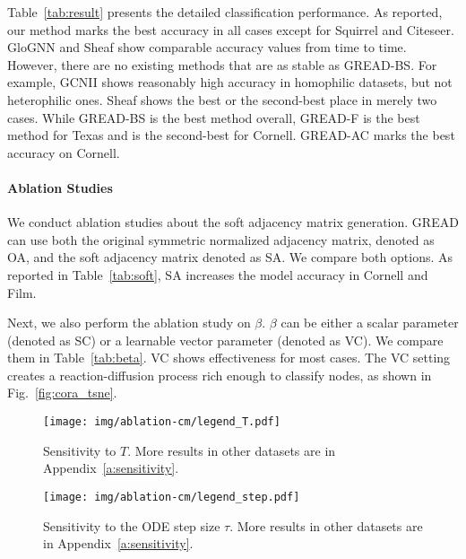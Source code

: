 \documentclass{article}
\theoremstyle{plain}
\theoremstyle{definition}
\theoremstyle{remark}
\begin{document}
Table~\ref{tab:result} presents the detailed classification performance. As reported, our method marks the best accuracy in all cases except for Squirrel and Citeseer. GloGNN and Sheaf show comparable accuracy values from time to time. However, there are no existing methods that are as stable as GREAD-BS. For example, GCNII shows reasonably high accuracy in homophilic datasets, but not heterophilic ones. Sheaf shows the best or the second-best place in merely two cases. While GREAD-BS is the best method overall, GREAD-F is the best method for Texas and is the second-best for Cornell. GREAD-AC marks the best accuracy on Cornell.

 
\paragraph{Ablation Studies} We conduct ablation studies about the soft adjacency matrix generation. GREAD can use both the original symmetric normalized adjacency matrix, denoted as OA, and the soft adjacency matrix denoted as SA. We compare both options. As reported in Table~\ref{tab:soft}, SA increases the model accuracy in Cornell and Film.

Next, we also perform the ablation study on $\beta$. $\beta$ can be either a scalar parameter (denoted as SC) or a learnable vector parameter (denoted as VC). We compare them in Table~\ref{tab:beta}. VC shows effectiveness for most cases. The VC setting creates a reaction-diffusion process rich enough to classify nodes, as shown in Fig.~\ref{fig:cora_tsne}.

 \begin{figure}[t]
    \centering
    \texttt{[image: img/ablation-cm/legend\_T.pdf]}
    \caption{Sensitivity to $T$. More results in other datasets are in Appendix~\ref{a:sensitivity}.}
    \label{fig:sens_T}
\end{figure}
\begin{figure}[t]
    \centering
    \texttt{[image: img/ablation-cm/legend\_step.pdf]}
    \caption{Sensitivity to the ODE step size $\tau$. More results in other datasets are in Appendix~\ref{a:sensitivity}.}
    \label{fig:sens_step}
\end{figure}
\end{document}
